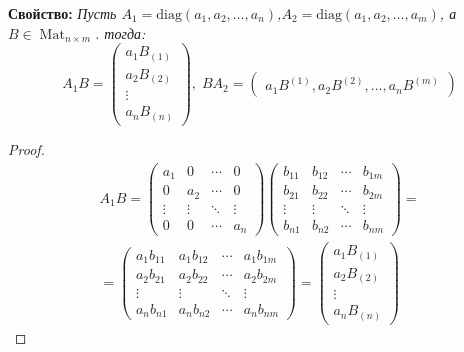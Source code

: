 \documentclass[a4paper, 12pt]{article}
\DeclareMathOperator{\Mat}{Mat}
\begin{document}
\textbf{Свойство:} \textit{Пусть $A_1 = \mathrm{diag}(a_1, a_2, \dots, a_n)$,$A_2 = \mathrm{diag}(a_1, a_2, \dots, a_m)$, а $B \in \Mat_{n \times m}$. тогда:
\[A_1B = \begin{pmatrix}
a_1B_{(1)}\\
a_2B_{(2)}\\
\vdots\\
a_nB_{(n)}
\end{pmatrix},\;BA_2 = \begin{pmatrix}a_1B^{(1)}, a_2B^{(2)}, \ldots, a_nB^{(m)}\end{pmatrix}\]}
\begin{proof}
\begin{multline*}
A_1B =
\begin{pmatrix}
a_1 & 0 & \cdots & 0 \\
0 & a_2 & \cdots & 0 \\         
\vdots & \vdots & \ddots & \vdots \\
0 & 0 & \cdots  & a_n
\end{pmatrix}
\begin{pmatrix}
b_{11} & b_{12} & \cdots & b_{1m} \\
b_{21} & b_{22} & \cdots & b_{2m} \\
\vdots & \vdots & \ddots & \vdots \\
b_{n1} & b_{n2} & \cdots & b_{nm}
\end{pmatrix} = \\
=
\begin{pmatrix}
a_1b_{11} & a_1b_{12} & \cdots & a_1b_{1m} \\
a_2b_{21} & a_2b_{22} & \cdots & a_2b_{2m} \\
\vdots & \vdots & \ddots & \vdots \\
a_nb_{n1} & a_nb_{n2} & \cdots & a_nb_{nm}
\end{pmatrix} = \begin{pmatrix}
a_1B_{(1)}\\
a_2B_{(2)}\\
\vdots\\
a_nB_{(n)}
\end{pmatrix}
\end{multline*}


\end{proof}
\end{document}
